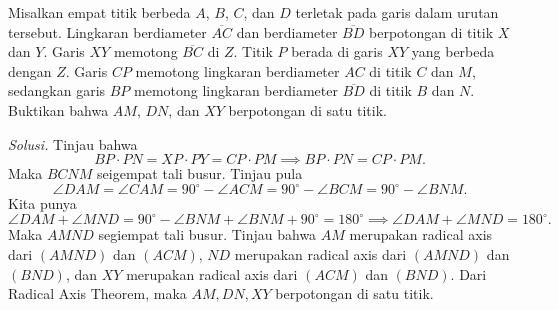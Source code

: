 \documentclass[12pt]{scrartcl}
\begin{document}
\begin{center}
\end{center}
\newpage
\begin{tcolorbox}[title=\textbf{Soal 7: IMO 1995/1}]
Misalkan empat titik berbeda $A$, $B$, $C$, dan $D$ terletak pada garis dalam urutan tersebut. Lingkaran berdiameter $\overline{AC}$ dan berdiameter $\overline{BD}$ berpotongan di titik $X$ dan $Y$. Garis $XY$ memotong $\overline{BC}$ di $Z$. Titik $P$ berada di garis $XY$ yang berbeda dengan $Z$. Garis $CP$ memotong lingkaran berdiameter $AC$ di titik $C$ dan $M$, sedangkan garis $BP$ memotong lingkaran berdiameter $\overline{BD}$ di titik $B$ dan $N$. Buktikan bahwa $AM$, $DN$, dan $XY$ berpotongan di satu titik.
\end{tcolorbox}
\noindent\textit{Solusi.} Tinjau bahwa
\[BP\cdot PN=XP\cdot PY = CP\cdot PM\implies BP\cdot PN = CP\cdot PM.\]
Maka $BCNM$ seigempat tali busur. Tinjau pula
\[\angle DAM=\angle CAM=90^\circ-\angle ACM=90^\circ-\angle BCM=90^\circ-\angle BNM.\]
Kita punya \[\angle DAM+\angle MND=90^\circ-\angle BNM+\angle BNM+90^\circ=180^\circ\implies \angle DAM+\angle MND=180^\circ.\] Maka $AMND$ segiempat tali busur. Tinjau bahwa $AM$ merupakan radical axis dari $(AMND)$ dan $(ACM)$, $ND$ merupakan radical axis dari $(AMND)$ dan $(BND)$, dan $XY$ merupakan radical axis dari $(ACM)$ dan $(BND)$. Dari {Radical Axis Theorem}, maka $AM,DN,XY$ berpotongan di satu titik.
\end{document}
